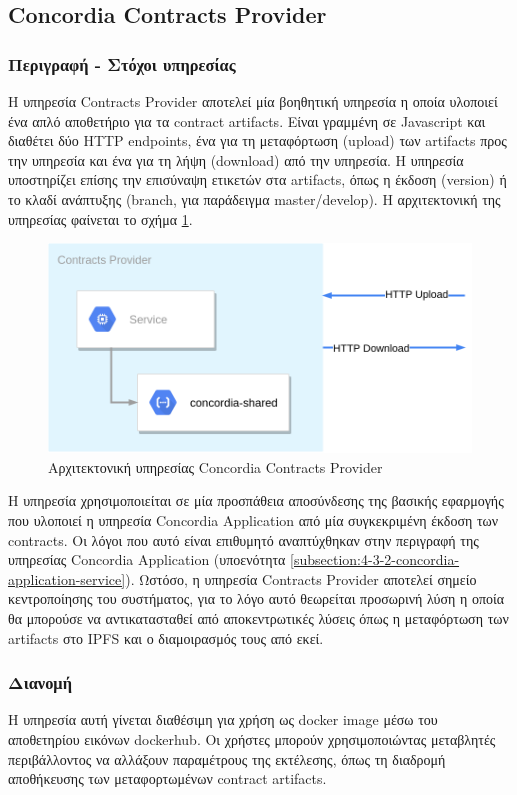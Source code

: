 \subsection{Concordia Contracts Provider} \label{subsection:4-3-5-concordia-contracts-provider-service}

\subsubsection{Περιγραφή - Στόχοι υπηρεσίας}

Η υπηρεσία Contracts Provider αποτελεί μία βοηθητική υπηρεσία η οποία υλοποιεί ένα απλό αποθετήριο για τα contract artifacts. Είναι γραμμένη σε Javascript και διαθέτει δύο HTTP \textenglish{endpoints}, ένα για τη μεταφόρτωση (upload) των artifacts προς την υπηρεσία και ένα για τη λήψη (download) από την υπηρεσία. Η υπηρεσία υποστηρίζει επίσης την επισύναψη ετικετών στα artifacts, όπως η έκδοση (version) ή το κλαδί ανάπτυξης (branch, για παράδειγμα \textenglish{master/develop}). Η αρχιτεκτονική της υπηρεσίας φαίνεται το σχήμα \ref{figure:4-3-concordia-contracts-provider-architecture}.

\begin{figure}[H]
    \centering
    \includegraphics[width=.6\textwidth]{assets/figures/chapter-4/4.3.architecture-4.3.5.concordia-contracts-provider-architecture}
    \caption{Αρχιτεκτονική υπηρεσίας Concordia Contracts Provider}
    \label{figure:4-3-concordia-contracts-provider-architecture}
\end{figure}

Η υπηρεσία χρησιμοποιείται σε μία προσπάθεια αποσύνδεσης της βασικής εφαρμογής που υλοποιεί η υπηρεσία Concordia Application από μία συγκεκριμένη έκδοση των contracts. Οι λόγοι που αυτό είναι επιθυμητό αναπτύχθηκαν στην περιγραφή της υπηρεσίας Concordia \textenglish{Application} (υποενότητα \ref{subsection:4-3-2-concordia-application-service}). Ωστόσο, η υπηρεσία Contracts Provider αποτελεί σημείο κεντροποίησης του συστήματος, για το λόγο αυτό θεωρείται προσωρινή λύση η οποία θα μπορούσε να αντικατασταθεί από αποκεντρωτικές λύσεις όπως η μεταφόρτωση των artifacts στο IPFS και ο διαμοιρασμός τους από εκεί.

\subsubsection{Διανομή}

Η υπηρεσία αυτή γίνεται διαθέσιμη για χρήση ως docker image μέσω του αποθετηρίου εικόνων dockerhub. Οι χρήστες μπορούν χρησιμοποιώντας μεταβλητές περιβάλλοντος να αλλάξουν παραμέτρους της εκτέλεσης, όπως τη διαδρομή αποθήκευσης των μεταφορτωμένων contract artifacts.